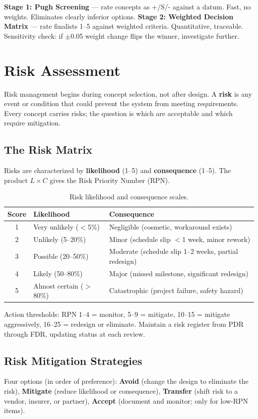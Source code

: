 \documentclass[11pt,letterpaper,twoside,openany]{book}
\begin{document}
\textbf{Stage 1: Pugh Screening} — rate concepts as +/S/- against a datum. Fast, no weights. Eliminates clearly inferior options. \textbf{Stage 2: Weighted Decision Matrix} — rate finalists 1--5 against weighted criteria. Quantitative, traceable. Sensitivity check: if $\pm$0.05 weight change flips the winner, investigate further.


\section{Risk Assessment}
Risk management begins during concept selection, not after design. A \textbf{risk} is any event or condition that could prevent the system from meeting requirements. Every concept carries risks; the question is which are acceptable and which require mitigation.

\subsection{The Risk Matrix}
Risks are characterized by \textbf{likelihood} (1--5) and \textbf{consequence} (1--5). The product $L \times C$ gives the Risk Priority Number (RPN).

\begin{table}[htbp]\centering\small
\begin{tabularx}{\textwidth}{c X X}
\toprule
\textbf{Score} & \textbf{Likelihood} & \textbf{Consequence} \\
\midrule
1 & Very unlikely ($<$5\%) & Negligible (cosmetic, workaround exists) \\
2 & Unlikely (5--20\%) & Minor (schedule slip $<$1 week, minor rework) \\
3 & Possible (20--50\%) & Moderate (schedule slip 1--2 weeks, partial redesign) \\
4 & Likely (50--80\%) & Major (missed milestone, significant redesign) \\
5 & Almost certain ($>$80\%) & Catastrophic (project failure, safety hazard) \\
\bottomrule
\end{tabularx}
\caption{Risk likelihood and consequence scales.}
\end{table}

Action thresholds: RPN 1--4 = monitor, 5--9 = mitigate, 10--15 = mitigate aggressively, 16--25 = redesign or eliminate. Maintain a risk register from PDR through FDR, updating status at each review.

\subsection{Risk Mitigation Strategies}
Four options (in order of preference): \textbf{Avoid} (change the design to eliminate the risk), \textbf{Mitigate} (reduce likelihood or consequence), \textbf{Transfer} (shift risk to a vendor, insurer, or partner), \textbf{Accept} (document and monitor; only for low-RPN items).
\end{document}
